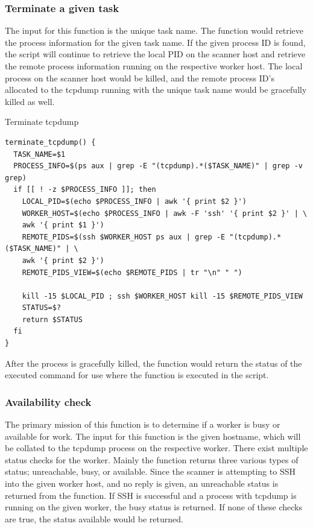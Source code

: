 \subsubsection{Terminate a given task}
\label{ss:TerminateTask}
The input for this function is the unique task name.
The function would retrieve the process information for the given task name.
If the given process ID is found, the script will continue to retrieve the local PID on the scanner host and retrieve the remote process information running on the respective worker host.
The local process on the scanner host would be killed, and the remote process ID's allocated to the tcpdump running with the unique task name would be gracefully killed as well.

\begin{listing}[!ht]
\caption{Terminate tcpdump}
\label{lst:TerminateTcpDump}
\begin{verbatim}
terminate_tcpdump() {
  TASK_NAME=$1
  PROCESS_INFO=$(ps aux | grep -E "(tcpdump).*($TASK_NAME)" | grep -v grep)
  if [[ ! -z $PROCESS_INFO ]]; then
    LOCAL_PID=$(echo $PROCESS_INFO | awk '{ print $2 }')
    WORKER_HOST=$(echo $PROCESS_INFO | awk -F 'ssh' '{ print $2 }' | \
    awk '{ print $1 }')
    REMOTE_PIDS=$(ssh $WORKER_HOST ps aux | grep -E "(tcpdump).*($TASK_NAME)" | \
    awk '{ print $2 }')
    REMOTE_PIDS_VIEW=$(echo $REMOTE_PIDS | tr "\n" " ")

    kill -15 $LOCAL_PID ; ssh $WORKER_HOST kill -15 $REMOTE_PIDS_VIEW
    STATUS=$?
    return $STATUS
  fi
}
\end{verbatim}
\end{listing}

After the process is gracefully killed, the function would return the status of the executed command for use where the function is executed in the script.

\subsubsection{Availability check}
\label{ss:AvailabilityCheck}
The primary mission of this function is to determine if a worker is busy or available for work.
The input for this function is the given hostname, which will be collated to the tcpdump process on the respective worker.
There exist multiple status checks for the worker.
Mainly the function returns three various types of status; unreachable, busy, or available.
Since the scanner is attempting to SSH into the given worker host, and no reply is given, an unreachable status is returned from the function. If SSH is successful and a process with tcpdump is running on the given worker, the busy status is returned. If none of these checks are true, the status available would be returned.

